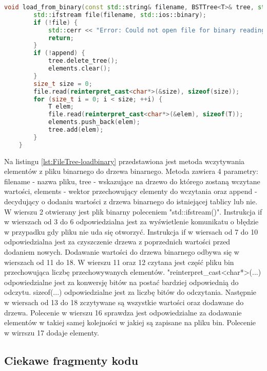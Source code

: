 \begin{lstlisting}[caption=Metoda \texttt{load\_to\_binary}, label={lst:FileTree-loadbinary}, language=C++]
	void load_from_binary(const std::string& filename, BSTTree<T>& tree, std::vector<T>& elements, bool append = false) {
		std::ifstream file(filename, std::ios::binary);
		if (!file) {
			std::cerr << "Error: Could not open file for binary reading.\n";
			return;
		}
		if (!append) {
			tree.delete_tree();
			elements.clear();
		}
		size_t size = 0;
		file.read(reinterpret_cast<char*>(&size), sizeof(size));
		for (size_t i = 0; i < size; ++i) {
			T elem;
			file.read(reinterpret_cast<char*>(&elem), sizeof(T));
			elements.push_back(elem);
			tree.add(elem);
		}
	}
\end{lstlisting}
Na listingu \ref{lst:FileTree-loadbinary} przedstawiona jest metoda wczytywania elementów z pliku binarnego do drzewa binarnego.
Metoda zawiera 4 parametry: filename - nazwa pliku, tree - wskazujące na drzewo do którego zostaną wczytane wartości, elements - wektor przechowujący elementy do wczytania oraz append - decydujący o dodaniu wartości z drzewa binarnego do istniejącej tablicy lub nie.
W wierszu 2 otwierany jest plik binarny poleceniem "std::ifstream()".
Instrukcja if w wierszach od 3 do 6 odpowiedzialna jest za wyświetlenie komunikatu o błędzie w przypadku gdy pliku nie uda się otworzyć.
Instrukcja if w wiersach od 7 do 10 odpowiedzialna jest za czyszczenie drzewa z poprzednich wartości przed dodaniem nowych.
Dodawanie wartości do drzewa binarnego odbywa się w wierszach od 11 do 18.
W wierszu 11 oraz 12 czytana jest część pliku bin przechowująca liczbę przechowywanych elementów. "reinterpret\_cast<char*>(...) odpowiedzialne jest za konwersję bitów na postać bardziej odpowiednią do odczytu. sizeof(...) odpowiedzialne jest za liczbę bitów do odczytania.
Następnie w wiersach od 13 do 18 zczytywane są wszystkie wartości oraz dodawane do drzewa. Polecenie w wierszu 16 sprawdza jest odpowiedzialne za dodawanie elementów w takiej samej kolejności w jakiej są zapisane na pliku bin. Polecenie w wirrszu 17 dodaje elementy.

\subsection{Ciekawe fragmenty kodu}
